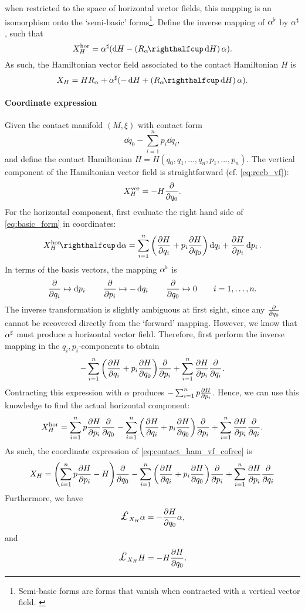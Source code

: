 when restricted to the space of horizontal vector fields, this mapping is an isomorphism onto the `semi-basic' forms\footnote{Semi-basic forms are forms that vanish when contracted with a vertical vector field. \cite{Libermann1987}}. Define the inverse mapping of $\alpha^\flat$ by $\alpha^\sharp$, such that
$$ X_H^\text{hor} = \fromDual{\alpha}\qty(\dd{H} - \qty(\intpr{R_\alpha}{\dd{H}})\,\alpha). $$
As such, the Hamiltonian vector field associated to the contact Hamiltonian $H$ is
\begin{equation}
    X_H = H R_\alpha + \fromDual{\alpha}(-\dd{H} + \qty(\intpr{R_\alpha}{\dd{H}})\,\alpha).
    \label{eq:contact_ham_vf_cofree}
\end{equation}

\paragraph{Coordinate expression} Given the contact manifold $(M, \xi)$ with contact form
$$ \dd{q_0} - \sum_{i = 1}^n p_i\dd{q_i}, $$
and define the contact Hamiltonian $H = H(q_0, q_1, \ldots, q_n, p_1, \ldots, p_n)$. 
The vertical component of the Hamiltonian vector field is straightforward (cf. \cref{eq:reeb_vf}): 
$$ X_H^\text{ver} = -H\pdv{}{q_0}. $$
For the horizontal component, first evaluate the right hand side of \cref{eq:basic_form} in coordinates:
$$ \intpr{X_H^\text{hor}}{\dd{\alpha}} =  \sum_{i = 1}^n \qty(\pdv{H}{q_i} + p_i \pdv{H}{q_0})\dd{q_i} + \pdv{H}{p_i}\dd{p_i}. $$
In terms of the basis vectors, the mapping $\alpha^\flat$ is
$$ \pdv{}{q_i} \mapsto \dd{p_i} \qquad \pdv{}{p_i} \mapsto -\dd{q_i} \qquad \pdv{}{q_0} \mapsto 0 \qquad i = 1, \ldots, n.$$
The inverse transformation is slightly ambiguous at first sight, since any $\pdv{}{q_0}$ cannot be recovered directly from the `forward' mapping. However, we know that $\alpha^\sharp$ must produce a horizontal vector field. Therefore, first perform the inverse mapping in the $q_i, p_i$-components to obtain
$$ - \sum_{i = 1}^n \qty(\pdv{H}{q_i} + p_i \pdv{H}{q_0})\pdv{}{p_i} + \sum_{i=1}^n \pdv{H}{p_i}\pdv{}{q_i}. $$
Contracting this expression with $\alpha$ produces $ - \sum_{i=1}^n p\pdv{H}{p_i} $. Hence, we can use this knowledge to find the actual horizontal component:
$$ X_H^\text{hor} = \sum_{i=1}^n p\pdv{H}{p_i} \pdv{}{q_0}- \sum_{i = 1}^n \qty(\pdv{H}{q_i} + p_i \pdv{H}{q_0})\pdv{}{p_i} + \sum_{i=1}^n \pdv{H}{p_i}\pdv{}{q_i}. $$
As such, the coordinate expression of \cref{eq:contact_ham_vf_cofree} is 
\begin{equation}
    X_H = \qty(\sum_{i=1}^n p\pdv{H}{p_i} - H) \pdv{}{q_0}- \sum_{i = 1}^n \qty(\pdv{H}{q_i} + p_i \pdv{H}{q_0})\pdv{}{p_i} + \sum_{i=1}^n \pdv{H}{p_i}\pdv{}{q_i}
\end{equation}
Furthermore, we have
$$ \lied{X_H} \alpha = - \pdv{H}{q_0} \alpha, $$ 
and 
$$ \lied{X_H} H = - H\pdv{H}{q_0}.  $$ 

